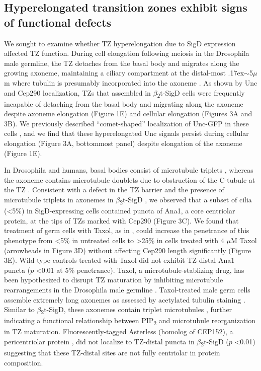 \documentclass[12pt, twoside, letterpaper]{article}
\newcommand{\PIP}{PIP\textsubscript{2}}
\newcommand{\sigd}{$\beta$\textsubscript{2}t-SigD}
\begin{document}
\begin{doublespacing}
\begin{linenumbers}
    \subsection*{Hyperelongated transition zones exhibit signs of functional defects}
    We sought to examine whether TZ hyperelongation due to SigD expression
    affected TZ function.
    During cell elongation following meiosis in the Drosophila male germline, the TZ detaches from
    the basal body and migrates along the growing axoneme, maintaining a ciliary compartment
    at the distal-most {\raise.17ex\hbox{$\scriptstyle\sim$}}5$\mu$m where tubulin
    is presumably incorporated into the axoneme
    \citep{basiri2014migrating, fabian2012drosophila}.
    As shown by Unc and Cep290 localization,
    TZs that assembled in \sigd{} cells were frequently incapable of detaching from
    the basal body and migrating along the axoneme despite
    axoneme elongation (Figure 1E) and cellular elongation
    (Figures 3A and 3B).
    We previously described ``comet-shaped'' localization of Unc-GFP in these cells
    \citep{wei2008depletion},
    and we find that these hyperelongated Unc signals persist during cellular elongation
    (Figure 3A, bottommost panel)
    despite elongation of the axoneme (Figure 1E).

    In Drosophila and humans, basal bodies consist of microtubule triplets
    \citep{jana2016drosophila, lattao2017centrioles},
    whereas the axoneme contains microtubule doublets due to obstruction of
    the C-tubule at the TZ \citep{gottardo2013cilium}.
    Consistent with a defect in the TZ barrier and the presence of
    microtubule triplets in axonemes in \sigd{} \citep{wei2008depletion},
    we observed that a subset of cilia (<5\%) in SigD-expressing cells
    contained puncta of Ana1, a core centriolar protein, at the tips
    of TZs marked with Cep290 (Figure 3C).
    We found that treatment of germ cells with Taxol, as in \citep{riparbelli2013unique},
    could increase the penetrance of this phenotype from <5\% in untreated cells
    to \textgreater25\% in cells treated with 4 $\mu$M Taxol (arrowheads in Figure 3D)
    without affecting Cep290 length significantly (Figure 3E).
    Wild-type controls treated with Taxol did not exhibit TZ-distal Ana1 puncta ($p$ <0.01 at 5\% penetrance).
    Taxol, a microtubule-stablizing drug, has been hypothesized to disrupt TZ maturation
    by inhibiting microtubule rearrangements in the Drosophila male germline \citep{riparbelli2012assembly, riparbelli2013unique}.
    Taxol-treated male germ cells assemble extremely long axonemes as assessed by acetylated tubulin staining \citep{riparbelli2013unique}.
    Similar to \sigd{}, these axonemes contain triplet microtubules
    \citep{riparbelli2013unique}, further indicating a functional relationship between
    \PIP{} and microtubule reorganization in TZ maturation.
    Fluorescently-tagged Asterless (homolog of CEP152), a pericentriolar protein
    \citep{blachon2008drosophila, dzhindzhev2010asterless},
    did not localize to TZ-distal puncta in \sigd{} ($p$ <0.01)
    suggesting that these TZ-distal
    sites are not fully centriolar in protein composition.


\end{linenumbers}
\end{doublespacing}
\end{document}

